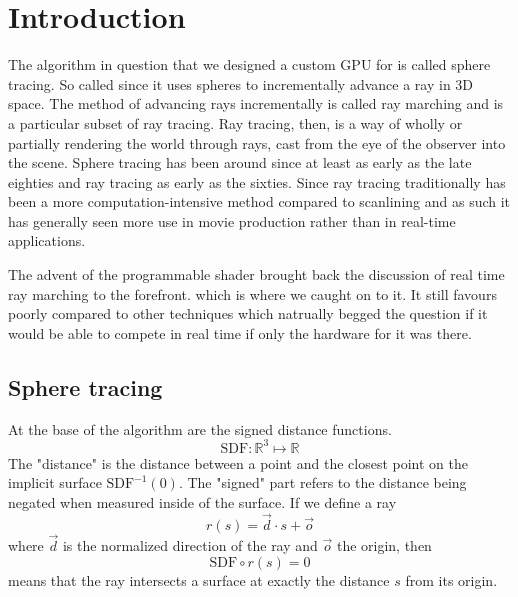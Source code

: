 \chapter{Introduction} 

The algorithm in question that we designed a custom GPU for is called sphere
tracing.\cite{Hart1996} So called since it uses spheres to incrementally
advance a ray in 3D space. The method of advancing rays incrementally is called
ray marching and is a particular subset of ray tracing.\cite{Whitted1980} Ray
tracing, then, is a way of wholly or partially rendering the world through
rays, cast from the eye of the observer into the scene.  Sphere tracing has
been around since at least as early as the late eighties and ray tracing as
early as the sixties.\cite{Hart1989,Appel1968} Since ray tracing traditionally
has been a more computation-intensive method compared to
scanlining\cite{Wylie1967} and as such it has generally seen more use in movie
production rather than in real-time applications.\cite{ref_needed?} 


The advent of the programmable shader brought back the discussion of real time
ray marching to the forefront. which is where we caught on to it.
\cite{JamieWong2016} It still favours poorly compared to other techniques which
natrually begged the question if it would be able to compete in real time if
only the hardware for it was there.

\section{Sphere tracing} 

\begin{minipage}{0.6\textwidth} 

	At the base of the algorithm are the signed distance functions.
	$$\text{SDF}:\mathbb{R}^{3}\mapsto\mathbb{R}$$ The "distance" is the distance
	between a point and the closest point on the implicit surface
	$\text{SDF}^{-1}(0)$. The "signed" part refers to the distance being negated
	when measured inside of the surface.  If we define a ray $$r(s) = \vec{d}
	\cdot s + \vec{o}$$ where $\vec{d}$ is the normalized direction of the ray
	and $\vec{o}$ the origin, then $$\text{SDF}\circ r(s) = 0$$ means that the
	ray intersects a surface at exactly the distance $s$ from its origin.

\end{minipage} 


